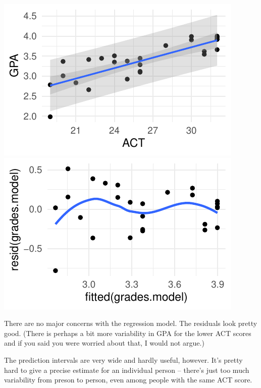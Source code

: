 \documentclass[twoside]{book}\usepackage[]{graphicx}\usepackage[]{xcolor}
\makeatletter
\def\maxwidth{ %
  \ifdim\Gin@nat@width>\linewidth
    \linewidth
  \else
    \Gin@nat@width
  \fi
}
\newenvironment{knitrout}{}{} %
\makeatother
\begin{document}
\begin{solution}
\begin{enumerate}
\begin{knitrout}
{\centering \includegraphics[width=\maxwidth]{figures/fig-unnamed-chunk-268-1} 
\includegraphics[width=\maxwidth]{figures/fig-unnamed-chunk-268-2} 

}



\end{knitrout}
			There are no major concerns with the regression model. The
			residuals look pretty good.  (There is perhaps a bit more variability
			in GPA for the lower ACT scores and if you said you were worried about
			that, I would not argue.)  

			The prediction intervals are very wide and hardly useful, however.
			It's pretty hard to give a precise estimate for an individual
			person -- there's just too much variability from preson to person, 
			even among people with the same ACT score. 
	\end{enumerate}
\end{solution}
\end{document}
